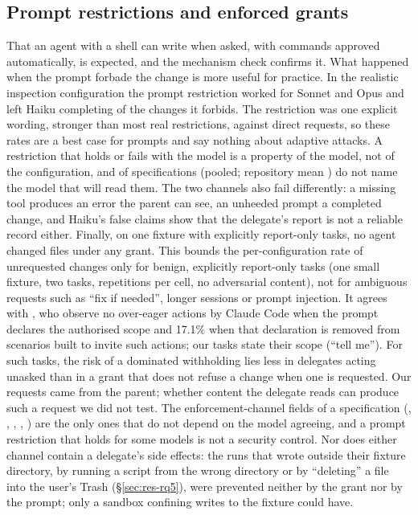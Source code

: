 

\subsection{Prompt restrictions and enforced grants}
\label{sec:disc-prompts}

That an agent with a shell can write when asked, with commands approved automatically, is expected, and the
mechanism check confirms it. What happened when the prompt forbade the change is more useful for practice. In the
realistic inspection configuration the prompt restriction worked for Sonnet and Opus and left Haiku completing \ExpCthreeHaiku{} of the changes it
forbids. The restriction was one explicit wording, stronger than most real restrictions, against direct requests, so
these rates are a best case for prompts and say nothing about adaptive attacks. A restriction that holds or fails with
the model is a property of the model, not of the configuration, and \RQfiveNoModelPooled{} of specifications (pooled;
repository mean \RQfiveNoModel{}) do not name the model that will read them. The two channels also fail differently: a
missing tool produces an error the parent can see, an unheeded prompt a completed change, and Haiku's false claims
show that the delegate's report is not a reliable record either. Finally, on one fixture with explicitly report-only
tasks, no agent changed files under any grant. This bounds the per-configuration rate of unrequested changes only for benign,
explicitly report-only tasks (one small fixture, two tasks, \nOverRepsFinal{} repetitions per cell, no adversarial
content), not for ambiguous requests such as ``fix if needed'', longer sessions or prompt injection. It agrees with
\citet{qu2026overeager}, who observe no over-eager actions by Claude Code when the prompt declares the authorised scope
and 17.1\% when that declaration is removed from scenarios built to invite such actions; our tasks state their scope
(``tell me''). For such tasks, the risk of a dominated withholding lies less in delegates acting
unasked than in a grant that does not refuse a change when one is requested. Our requests came from the parent;
whether content the delegate reads can produce such a request \citep{debenedetti2024agentdojo} we did not test. The
enforcement-channel fields of a specification (, , ,
, ) are the only ones that do not depend on the model agreeing, and a prompt restriction
that holds for some models is not a security control. Nor does either channel contain a delegate's side effects: the
runs that wrote outside their fixture directory, by running a script from the wrong directory or by ``deleting'' a file
into the user's Trash (\S\ref{sec:res-rq5}), were prevented neither by the grant nor by the prompt; only a sandbox
confining writes to the fixture could have.

